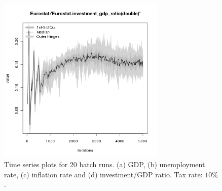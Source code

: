 \begin{figure}[ht!]
\begin{minipage}{17cm}
\includegraphics[width=8cm]{./transient/tax_0.10/Eurostat-investment_gdp_ratio-timebatch.png}
\end{minipage}
\caption{Time series plots for 20 batch runs. (a) GDP, (b) unemployment rate, (c) inflation rate and (d) investment/GDP ratio. Tax rate: $10\%$.}
\label{Figure: transient time}
\end{figure}


